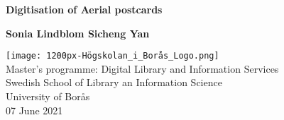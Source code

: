 \begin{titlepage}
	\begin{center}
		\vspace*{1cm}
		
		{\Large \textbf{Digitisation of Aerial postcards}}
		
		\vspace{0.5cm}
	
		
		\vspace{1.5cm}
		
		\textbf{Sonia Lindblom \quad \quad Sicheng Yan}
		
		\vfill
		
		
		
		\vspace{0.8cm}
		
		\texttt{[image: 1200px-Högskolan\_i\_Borås\_Logo.png]}\\
		\vspace{0.4cm}
		Master's programme: Digital Library and Information Services\\
		Swedish School of Library an Information Science \\
		University of Borås\\
		07 June 2021
	
		
	\end{center}
\end{titlepage}